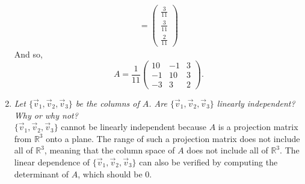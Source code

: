 \documentclass[12pt]{article}
\begin{document}
\begin{enumerate}[label=(\alph*)]
\begin{gather*}
		=
		\begin{pmatrix}
			\frac{3}{11} \\ \frac{3}{11} \\ \frac{2}{11}
		\end{pmatrix}
	\end{gather*}
	And so,
	\begin{equation*}
		\boxed{
			A =
			\frac{1}{11}
			\begin{pmatrix}
				10 & -1 & 3 \\
				-1 & 10 & 3 \\
				-3 & 3 & 2
			\end{pmatrix}
		}
		.
	\end{equation*}
	
	\item \textit{Let $\{\vec{v}_1, \vec{v}_2, \vec{v}_3\}$ be the columns of
	$A$. Are $\{\vec{v}_1, \vec{v}_2, \vec{v}_3\}$ linearly independent? Why
	or why not?}\\[\baselineskip]
	$\{\vec{v}_1, \vec{v}_2, \vec{v}_3\}$ cannot be linearly independent
	because $A$ is a projection matrix from $\mathbb{R}^3$ onto a plane. The
	range of such a projection matrix does not include all of $\mathbb{R}^3$,
	meaning that the column space of $A$ does not include all of
	$\mathbb{R}^3$. The linear dependence of
	$\{\vec{v}_1, \vec{v}_2, \vec{v}_3\}$ can also be verified by computing
	the determinant of $A$, which should be $0$.
\end{enumerate}
\end{document}
